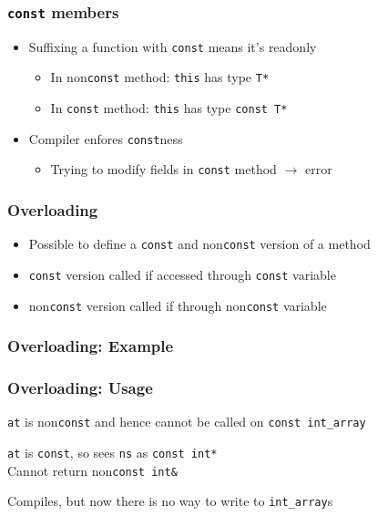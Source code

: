 \begin{frame}
  \frametitle{{\tt const} members}
  \begin{itemize}
    \item Suffixing a function with {\tt const} means it's readonly
          \begin{itemize}
            \item In non{\tt const} method: {\tt this} has type {\tt T*}
            \item In {\tt const} method: {\tt this} has type {\tt const T*}
          \end{itemize}
    \item Compiler enfores \texttt{const}ness
          \begin{itemize}
            \item Trying to modify fields in {\tt const} method $\rightarrow$ error
          \end{itemize}
  \end{itemize}
\end{frame}

\begin{frame}
  \frametitle{Overloading}
  \begin{itemize}
    \item Possible to define a {\tt const} and non{\tt const} version of a method
    \item {\tt const} version called if accessed through {\tt const} variable
    \item non{\tt const} version called if through non{\tt const} variable
  \end{itemize}
\end{frame}

\begin{frame}
  \frametitle{Overloading: Example}
\end{frame}

\begin{frame}
  \frametitle{Overloading: Usage}
  \begin{overprint}
    \begin{center}
      {\tt at} is non{\tt const} and hence cannot be called
      on {\tt const int\_array}
    \end{center}

    \begin{center}
      {\tt at} is {\tt const}, so sees {\tt ns} as {\tt const int*} \\
      Cannot return non{\tt const int\&}
    \end{center}

    \begin{center}
      Compiles, but now there is no way to write to {\tt int\_array}s
    \end{center}
  \end{overprint}
\end{frame}

